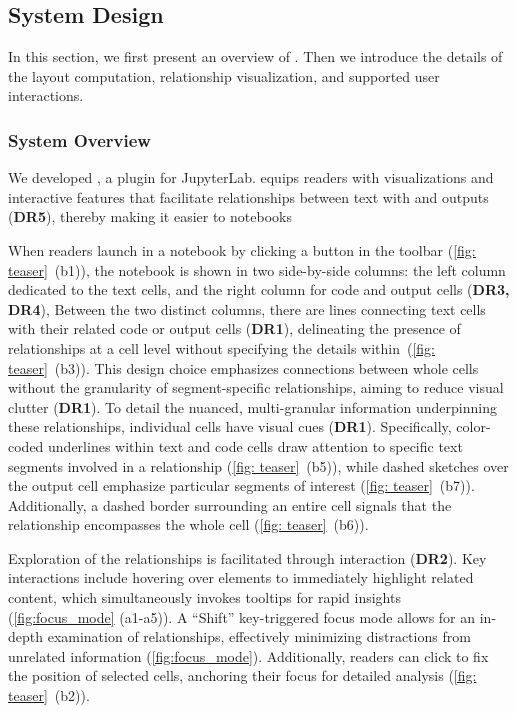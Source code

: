 \subsection{System Design}
\label{sec:system_design}
In this section, we first present an overview of \tool.
Then we introduce the details of the layout computation, relationship visualization, and supported user interactions.

\subsubsection{System Overview}
\label{sec:overview}
We developed \tool, a plugin for JupyterLab. \tool equips readers with visualizations and interactive features that facilitate  relationships between text with  and outputs (\textbf{DR5}), thereby making it easier to  notebooks 

When readers launch \tool in a notebook by clicking a button in the toolbar (\autoref{fig: teaser}~(b1)), the notebook is shown in two side-by-side columns: the left column dedicated to the text cells, and the right column for code and output cells (\textbf{DR3, DR4}),
Between the two distinct columns, there are lines connecting text cells with their related code or output cells (\textbf{DR1}), delineating the presence of relationships at a cell level without specifying the details within~(\autoref{fig: teaser}~(b3)).
This design choice emphasizes connections between whole cells without the granularity of segment-specific relationships, aiming to reduce visual clutter (\textbf{DR1}).
To detail the nuanced, multi-granular information underpinning these relationships, individual cells have visual cues (\textbf{DR1}).
Specifically, color-coded underlines within text and code cells draw attention to specific text segments involved in a relationship (\autoref{fig: teaser}~(b5)), while dashed sketches over the output cell emphasize particular segments of interest (\autoref{fig: teaser}~(b7)). 
Additionally, a dashed border surrounding an entire cell signals that the relationship encompasses the whole cell (\autoref{fig: teaser}~(b6)). 


Exploration of the relationships is facilitated through interaction (\textbf{DR2}). 
Key interactions include hovering over elements to immediately highlight related content, which simultaneously invokes tooltips for rapid insights (\autoref{fig:focus_mode} (a1-a5)). 
A ``Shift'' key-triggered focus mode allows for an in-depth examination of relationships, effectively minimizing distractions from unrelated information (\autoref{fig:focus_mode}). 
Additionally, readers can click to fix the position of selected cells, anchoring their focus for detailed analysis (\autoref{fig: teaser}~(b2)). 



